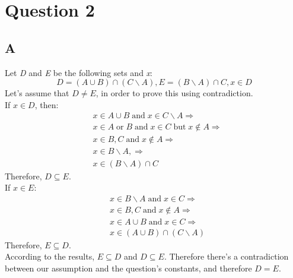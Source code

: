 \documentclass[12pt, oneside]{article}
\begin{document}
\section{Question 2}
\subsection{A}
Let \emph{D} and \emph{E} be the following sets and \emph{x}:
\begin{equation*}
D = (A \cup B) \cap (C \backslash A), E = (B \backslash A) \cap C, x \in D
\end{equation*}
Let's assume that $D \neq E$, in order to prove this using contradiction.\\
If $x \in D$, then:
\begin{equation*}
\begin{split}
& x \in A \cup B\;\text{and}\;x \in C \backslash A \Rightarrow \\
& x \in A\;\text{or}\;B\;\text{and}\;x \in C\;\text{but}\;x \not\in A \Rightarrow \\
& x \in B, C\;\text{and}\; x \not\in A\Rightarrow \\
& x \in B \backslash A, \Rightarrow \\
& x \in (B \backslash A) \cap C
\end{split}
\end{equation*}
Therefore, $D \subseteq E$.\\
If $x \in E$:
\begin{equation*}
\begin{split}
& x \in B \backslash A\;\text{and}\;x \in C \Rightarrow \\
& x \in B, C\;\text{and}\;x \not\in A \Rightarrow \\
& x \in A \cup B\;\text{and}\;x \in C \Rightarrow \\
& x \in (A \cup B) \cap (C \backslash A)
\end{split}
\end{equation*}
Therefore, $E \subseteq D$.\\
According to the results, $E \subseteq D$ and $D \subseteq E$. Therefore there's a contradiction between our assumption and the question's constants, and therefore $D = E$.
\end{document}
